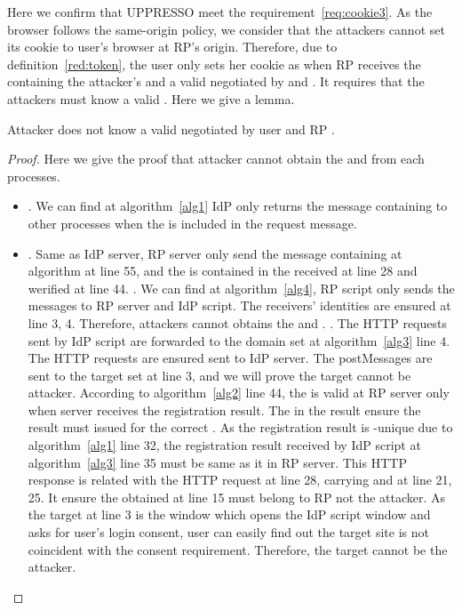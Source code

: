 \begin{appendices}
Here we confirm that UPPRESSO meet the requirement~\ref{req:cookie3}. As the browser follows the same-origin policy, we consider that the attackers cannot set its cookie to user's browser at RP's origin. Therefore, due to definition~\ref{red:token}, the user only  sets her cookie as  when RP receives the  containing the attacker's  and a  valid  negotiated by  and . It requires that the attackers must know a valid . Here we give a lemma.
\begin{relemma}
Attacker does not know a valid  negotiated by user  and RP . 
\end{relemma} 
\begin{proof}
Here we give the proof that attacker cannot obtain the  and  from each processes.
\begin{itemize}
\item {}. We can find at algorithm~\ref{alg1} IdP only returns the message containing  to other processes when the  is included in the request message. 
\item {}. Same as IdP server, RP server only send the message containing  at algorithm at line 55, and the  is contained in the  received at line 28 and werified at line 44.
. We can find at algorithm~\ref{alg4}, RP script  only sends the messages to RP server and IdP script. The receivers' identities are ensured at line 3, 4. Therefore, attackers cannot obtains the   and .
. The HTTP requests sent by IdP script are forwarded to the domain set at algorithm~\ref{alg3} line 4. The HTTP requests are ensured sent to IdP server. The postMessages are sent to the target set at line 3, and we will prove the target cannot be attacker.  
According to algorithm~\ref{alg2} line 44, the  is valid at RP server only when server receives the registration result. The  in the result ensure the result must issued for the correct . As the registration result is -unique due to algorithm~\ref{alg1} line 32, the registration result received by IdP script at algorithm~\ref{alg3} line 35 must be same as it in RP server. This HTTP response is related with the HTTP request at line 28, carrying  and  at line 21, 25. It ensure the  obtained at line 15 must belong to RP not the attacker. As the target at line 3 is the window which opens the IdP script window and asks for user's login consent, user can easily find out the target site is not coincident with the consent requirement. Therefore, the target cannot be the attacker.
\end{itemize}
\end{proof}



\end{appendices}

